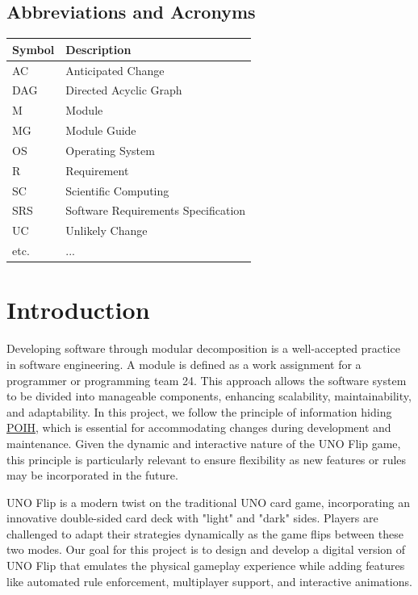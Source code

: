 \documentclass[12pt, titlepage]{article}
\begin{document}
\subsection{Abbreviations and Acronyms}

\renewcommand{\arraystretch}{1.2}
\begin{tabular}{l l} 
  \toprule		
  \textbf{Symbol} & \textbf{Description}\\
  \midrule 
  AC & Anticipated Change\\
  DAG & Directed Acyclic Graph \\
  M & Module \\
  MG & Module Guide \\
  OS & Operating System \\
  R & Requirement\\
  SC & Scientific Computing \\
  SRS & Software Requirements Specification\\
  UC & Unlikely Change \\
  etc. & ...\\
  \bottomrule
\end{tabular}

\tableofcontents

\listoftables

\listoffigures

\newpage


\section{Introduction}

Developing software through modular decomposition is a well-accepted practice in software engineering. A module is defined as a work assignment for a programmer or programming team 24. This approach allows the software system to be divided into manageable components, enhancing scalability, maintainability, and adaptability. In this project, we follow the principle of information hiding \href{https://stackoverflow.com/questions/24626/abstraction-vs-information-hiding-vs-encapsulation}{POIH}, which is essential for accommodating changes during development and maintenance. Given the dynamic and interactive nature of the UNO Flip game, this principle is particularly relevant to ensure flexibility as new features or rules may be incorporated in the future.

UNO Flip is a modern twist on the traditional UNO card game, incorporating an innovative double-sided card deck with "light" and "dark" sides. Players are challenged to adapt their strategies dynamically as the game flips between these two modes. Our goal for this project is to design and develop a digital version of UNO Flip that emulates the physical gameplay experience while adding features like automated rule enforcement, multiplayer support, and interactive animations. 
\end{document}
